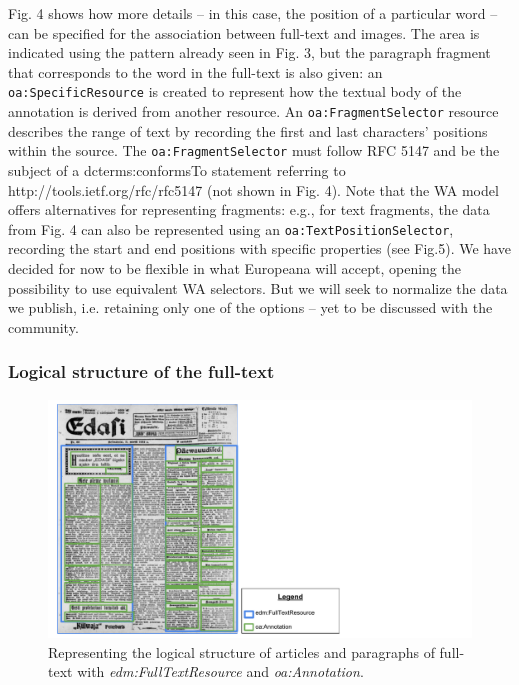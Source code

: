\documentclass[a4paper,UKenglish,cleveref, autoref]{oasics-v2019}
\begin{document}
Fig. 4 shows how more details – in this case, the position of a particular word –  can be specified for the association between full-text and images. The area is indicated using the pattern already seen in Fig. 3, but the paragraph fragment that corresponds to the word in the full-text is also given: an \verb+oa:SpecificResource+ is created to represent how the textual body of the annotation is derived from another resource. An \verb+oa:FragmentSelector+ resource describes the range of text by recording the first and last characters' positions within the source. The \verb+oa:FragmentSelector+ must follow RFC 5147 and be the subject of a dcterms:conformsTo statement referring to http://tools.ietf.org/rfc/rfc5147 (not shown in Fig. 4). Note that the WA model offers alternatives for representing fragments: e.g., for text fragments, the data from Fig. 4 can also be represented using an \verb+oa:TextPositionSelector+, recording the start and end positions with specific properties (see Fig.5). We have decided for now to be flexible in what Europeana will accept, opening the possibility to use equivalent WA selectors. But we will seek to normalize the data we publish, i.e. retaining only one of the options – yet to be discussed with the community.

\subsubsection{Logical structure of the full-text}

\begin{figure}
    \centering
    \includegraphics{Fig6}
    \caption{Representing the logical structure of articles and paragraphs of full-text with \emph{edm:FullTextResource} and \emph{oa:Annotation}.}
\end{figure}
\end{document}
